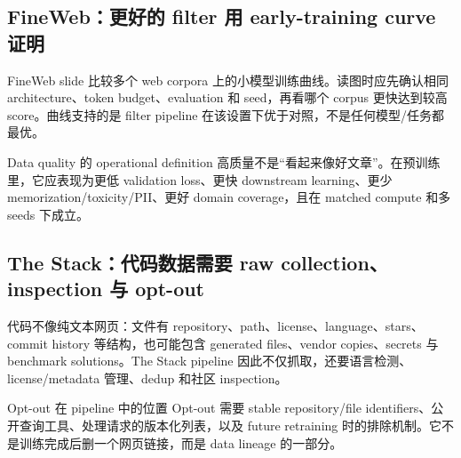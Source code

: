
\subsection{FineWeb：更好的 filter 用 early-training curve 证明}

FineWeb slide 比较多个 web corpora 上的小模型训练曲线。读图时应先确认相同 architecture、token budget、evaluation 和 seed，再看哪个 corpus 更快达到较高 score。曲线支持的是 filter pipeline 在该设置下优于对照，不是任何模型/任务都最优。


\begin{importantbox}{Data quality 的 operational definition}
高质量不是“看起来像好文章”。在预训练里，它应表现为更低 validation loss、更快 downstream learning、更少 memorization/toxicity/PII、更好 domain coverage，且在 matched compute 和多 seeds 下成立。
\end{importantbox}

\subsection{The Stack：代码数据需要 raw collection、inspection 与 opt-out}

代码不像纯文本网页：文件有 repository、path、license、language、stars、commit history 等结构，也可能包含 generated files、vendor copies、secrets 与 benchmark solutions。The Stack pipeline 因此不仅抓取，还要语言检测、license/metadata 管理、dedup 和社区 inspection。



\begin{knowledgebox}{Opt-out 在 pipeline 中的位置}
Opt-out 需要 stable repository/file identifiers、公开查询工具、处理请求的版本化列表，以及 future retraining 时的排除机制。它不是训练完成后删一个网页链接，而是 data lineage 的一部分。
\end{knowledgebox}

